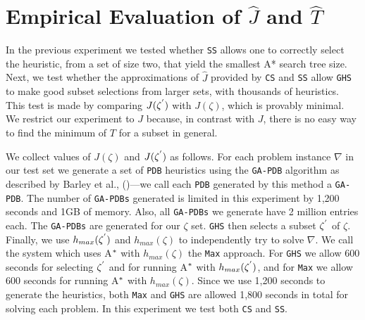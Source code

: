 %
%
%

\section{Empirical Evaluation of $\hat{J}$ and $\hat{T}$}



\noindent
In the previous experiment we tested whether \texttt{SS} allows one to correctly select the heuristic, from a set of size two, that yield the smallest A* search tree size. Next, we test whether the approximations of $\hat{J}$ provided by \texttt{CS} and \texttt{SS} allow \texttt{GHS} to make good subset selections from larger sets, with thousands of heuristics. This test is made by comparing $J(\zeta\sp{'})$ with $J(\zeta)$, which is provably minimal. We restrict our experiment to $J$ because, in contrast with $J$, there is no easy way to find the minimum of $T$ for a subset in general. 

We collect values of $J(\zeta)$ and $J(\zeta\sp{'})$ as follows. For each problem instance $\nabla$ in our test set we generate a set of \texttt{PDB} heuristics using the \texttt{GA-PDB} algorithm as described by Barley et al., (\citeyear{BarleySantiagoOver})---we call each \texttt{PDB} generated by this method a \texttt{GA-PDB}. The number of \texttt{GA-PDBs} generated is limited in this experiment by 1,200 seconds and 1GB of memory. Also, all \texttt{GA-PDBs} we generate have 2 million entries each. The \texttt{GA-PDBs} are generated for our $\zeta$ set. \texttt{GHS} then selects a subset $\zeta\sp{'}$ of $\zeta$. Finally, we use $h_{max}(\zeta\sp{'})$ and $h_{max}(\zeta)$ to independently try to solve $\nabla$. We call the system which uses A$\sp{*}$ with $h_{max}(\zeta)$ the \texttt{Max} approach. For \texttt{GHS} we allow 600 seconds for selecting $\zeta\sp{'}$ and for running A$\sp{*}$ with $h_{max}(\zeta\sp{'})$, and for \texttt{Max} we allow 600 seconds for running A$\sp{*}$ with $h_{max}(\zeta)$. Since we use 1,200 seconds to generate the heuristics, both \texttt{Max} and \texttt{GHS} are allowed 1,800 seconds in total for solving each problem. In this experiment we test both \texttt{CS} and \texttt{SS}.

